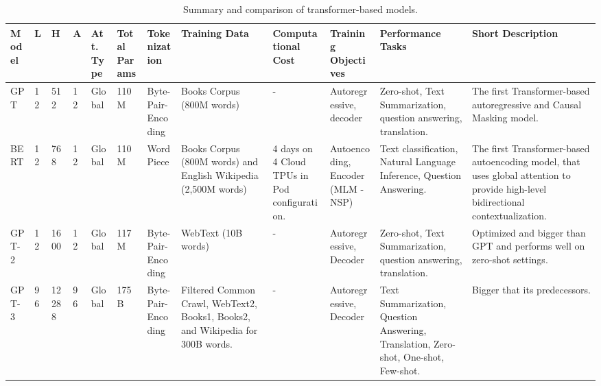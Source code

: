 \documentclass{article}
\begin{document}
\begin{center}
\small
{}
\begin{landscape}
\footnotesize
\begin{longtable}{ | p{1.3cm} | p{0.3cm} | p{0.7cm} | p{0.3cm}| p{0.8cm} | p{0.8cm} |p{1.6cm} | p{2.5cm} | p{1.9cm} | p{1.9cm} | p{2.8cm} | p{3cm}|} 
\caption{Summary and comparison of transformer-based models.}
\label{tab:timelineA1}
\\ 
\hline
\centering

\textbf{Model} & 
\textbf{L}  & 
\textbf{H}  & 
\textbf{A}  & 
\textbf{Att. Type}  & 
\textbf{Total Params}  & 
\textbf{Tokenization}  & 
\textbf{Training Data}  & 
\textbf{Computational Cost}  &
\textbf{Training Objectives}  & 
\textbf{Performance Tasks}  & 
\textbf{Short Description}  \\ 
\hline
    GPT
    & 12 
    & 512
    & 12 
    & Global 
    & 110M 
    & Byte-Pair-Encoding \cite{sennrich2015neural}
    & Books Corpus (800M words)
    & -
    & Autoregressive, decoder
    & Zero-shot, Text Summarization, question answering, translation.
    & The first Transformer-based autoregressive and Causal Masking model.
    
    \\
    
    BERT         
    & 12 
    & 768 
    & 12 
    & Global 
    & 110M 
    & WordPiece \cite{wu2016google}
    & Books Corpus (800M words) and English Wikipedia (2,500M words) 
    & 4 days on 4 Cloud TPUs in Pod configuration.
    & Autoencoding, Encoder (MLM - NSP)
    & Text classification, Natural Language Inference, Question Answering.
    & The first Transformer-based autoencoding model, that uses global attention to provide high-level bidirectional contextualization.
    
    \\
    
    GPT-2       
    & 12
    & 1600
    & 12 
    & Global 
    & 117M
    & Byte-Pair-Encoding 
    & WebText (10B words) 
    & - 
    & Autoregressive, Decoder
    & Zero-shot, Text Summarization, question answering, translation.
    & Optimized and bigger than GPT and performs well on zero-shot settings.
    
    \\
    
    GPT-3        
    & 96 
    & 12288
    & 96 
    & Global 
    & 175B 
    & Byte-Pair-Encoding  
    & Filtered Common Crawl, WebText2, Books1, Books2, and Wikipedia for 300B words.
    & -
    & Autoregressive, Decoder
    & Text Summarization, Question Answering, Translation, Zero-shot, One-shot, Few-shot.
    & Bigger that its predecessors.
    

\end{longtable}
\end{landscape}
\end{center}
\end{document}
